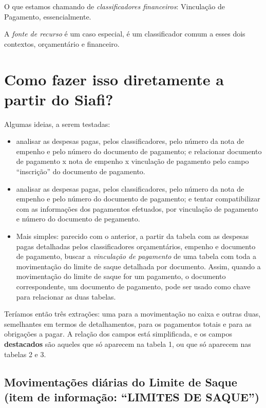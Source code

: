 \documentclass[]{book}
\begin{document}
O que estamos chamando de \emph{classificadores financeiros}: Vinculação de Pagamento, essencialmente.

A \emph{fonte de recurso} é um caso especial, é um classificador comum a esses dois contextos, orçamentário e financeiro.

\hypertarget{como-fazer-isso-diretamente-a-partir-do-siafi}{%
\section{Como fazer isso diretamente a partir do Siafi?}\label{como-fazer-isso-diretamente-a-partir-do-siafi}}

Algumas ideias, a serem testadas:

\begin{itemize}
\item
  analisar as despesas pagas, pelos classificadores, pelo número da nota de empenho e pelo número do documento de pagamento; e relacionar documento de pagamento x nota de empenho x vinculação de pagamento pelo campo ``inscrição'' do documento de pagamento.
\item
  analisar as despesas pagas, pelos classificadores, pelo número da nota de empenho e pelo número do documento de pagamento; e tentar compatibilizar com as informações dos pagamentos efetuados, por vinculação de pagamento e número do documento de pegamento.
\item
  Mais simples: parecido com o anterior, a partir da tabela com as despesas pagas detalhadas pelos classificadores orçamentários, empenho e documento de pagamento, buscar a \emph{vinculação de pagamento} de uma tabela com toda a movimentação do limite de saque detalhada por documento. Assim, quando a movimentação do limite de saque for um pagamento, o documento correspondente, um documento de pagamento, pode ser usado como chave para relacionar as duas tabelas.
\end{itemize}

Teríamos então três extrações: uma para a movimentação no caixa e outras duas, semelhantes em termos de detalhamentos, para os pagamentos totais e para as obrigações a pagar. A relação dos campos está simplificada, e os campos \textbf{destacados} são aqueles que só aparecem na tabela 1, ou que só aparecem nas tabelas 2 e 3.

\hypertarget{movimentauxe7uxf5es-diuxe1rias-do-limite-de-saque-item-de-informauxe7uxe3o-limites-de-saque}{%
\subsection{Movimentações diárias do Limite de Saque (item de informação: ``LIMITES DE SAQUE'')}\label{movimentauxe7uxf5es-diuxe1rias-do-limite-de-saque-item-de-informauxe7uxe3o-limites-de-saque}}
\end{document}
